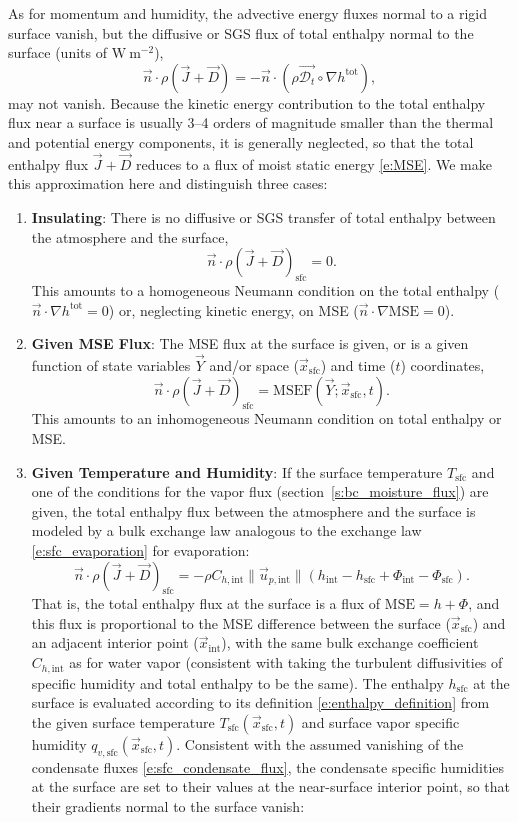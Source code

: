 \documentclass{report}
\begin{document}
As for momentum and humidity, the advective energy fluxes normal to a rigid surface vanish, but the diffusive or SGS flux of total enthalpy normal to the surface (units of $\mathrm{W~m^{-2}}$),
\[
\vec{n} \cdot \rho (\vec{J} + \vec{D}) = -\vec{n} \cdot (\rho \vec{\mathcal{D}_t} \circ \nabla h^{\mathrm{tot}}),
\]
may not vanish. Because the kinetic energy contribution to the total enthalpy flux near a surface is usually 3--4 orders of magnitude smaller than the thermal and potential energy components, it is generally neglected, so that the total enthalpy flux $\vec{J} + \vec{D}$ reduces to a flux of moist static energy \eqref{e:MSE}. We make this approximation here and distinguish three cases:
\begin{enumerate}
    \item \textbf{Insulating}: There is no diffusive or SGS transfer of total enthalpy between the atmosphere and the surface,
    \[
    \vec{n} \cdot \rho (\vec{J} + \vec{D})_\mathrm{sfc} = 0.
    \]
    This amounts to a homogeneous Neumann condition on the total enthalpy ($\vec{n} \cdot \nabla h^\mathrm{tot}=0$) or, neglecting kinetic energy, on MSE ($\vec{n} \cdot \nabla \mathrm{MSE} =0$).
    \item \textbf{Given MSE Flux}: The MSE flux at the surface is given, or is a given function of state variables $\vec{Y}$ and/or space ($\vec{x}_\mathrm{sfc}$) and time ($t$) coordinates,
    \[
    \vec{n} \cdot \rho (\vec{J} + \vec{D})_\mathrm{sfc} = \mathrm{MSEF}(\vec{Y}; \vec{x}_\mathrm{sfc}, t).
    \]
    This amounts to an inhomogeneous Neumann condition on total enthalpy or MSE.
    \item \textbf{Given Temperature and Humidity}: If the surface temperature $T_\mathrm{sfc}$ and one of the conditions for the vapor flux (section~\ref{s:bc_moisture_flux}) are given, the total enthalpy flux between the atmosphere and the surface is modeled by a bulk exchange law analogous to the exchange law \eqref{e:sfc_evaporation} for evaporation:
    \begin{equation}\label{e:sfc_energy_flux}
    \vec{n} \cdot \rho (\vec{J} + \vec{D})_\mathrm{sfc} = -\rho C_{h, \mathrm{int}} \| \vec{u}_{p,\mathrm{int}} \| 
     \left( h_\mathrm{int} -h_\mathrm{sfc} + \Phi_\mathrm{int} -  \Phi_\mathrm{sfc} \right).
    \end{equation}
    That is, the total enthalpy flux at the surface is a flux of $\mathrm{MSE} =h + \Phi$, and this flux is proportional to the MSE difference between the surface ($\vec{x}_\mathrm{sfc}$) and an adjacent interior point ($\vec{x}_\mathrm{int}$), with the same bulk exchange coefficient $C_{h, \mathrm{int}}$ as for water vapor (consistent with taking the turbulent diffusivities of specific humidity and total enthalpy to be the same). The enthalpy $h_\mathrm{sfc}$ at the surface is evaluated according to its definition \eqref{e:enthalpy_definition} from the given surface temperature $T_\mathrm{sfc}(\vec{x}_\mathrm{sfc}, t)$ and surface vapor specific humidity $q_{v, \mathrm{sfc}}(\vec{x}_\mathrm{sfc}, t)$. Consistent with the assumed vanishing of the condensate fluxes \eqref{e:sfc_condensate_flux}, the condensate specific humidities at the surface are set to their values at the near-surface interior point, so that their gradients normal to the surface vanish:

\end{enumerate}
\end{document}
